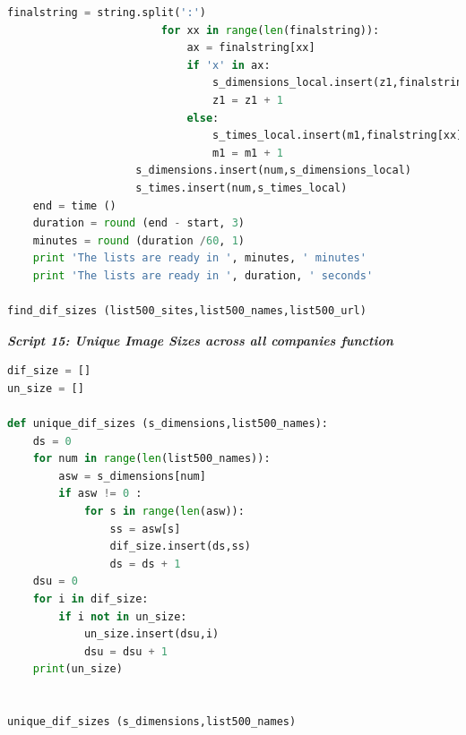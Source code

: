 \documentclass{article}
\begin{document}
\begin{lstlisting}[language=Python]
                        finalstring = string.split(':')                       
                        for xx in range(len(finalstring)):
                            ax = finalstring[xx]
                            if 'x' in ax:
                                s_dimensions_local.insert(z1,finalstring[xx])
                                z1 = z1 + 1
                            else:
                                s_times_local.insert(m1,finalstring[xx])
                                m1 = m1 + 1  
                    s_dimensions.insert(num,s_dimensions_local)
                    s_times.insert(num,s_times_local)                
    end = time ()
    duration = round (end - start, 3)
    minutes = round (duration /60, 1)
    print 'The lists are ready in ', minutes, ' minutes'
    print 'The lists are ready in ', duration, ' seconds'

find_dif_sizes (list500_sites,list500_names,list500_url)
\end{lstlisting} 

\begin{center}
\textit{\textbf{Script 15: Unique Image Sizes across all companies function}}\label{p15}
\end{center}
\begin{lstlisting}[language=Python]
dif_size = []  
un_size = [] 

def unique_dif_sizes (s_dimensions,list500_names):
    ds = 0
    for num in range(len(list500_names)):
        asw = s_dimensions[num]
        if asw != 0 :
            for s in range(len(asw)):
                ss = asw[s]
                dif_size.insert(ds,ss)
                ds = ds + 1    
    dsu = 0
    for i in dif_size:
        if i not in un_size:
            un_size.insert(dsu,i)
            dsu = dsu + 1
    print(un_size)          
 

unique_dif_sizes (s_dimensions,list500_names)
\end{lstlisting}
\end{document}
